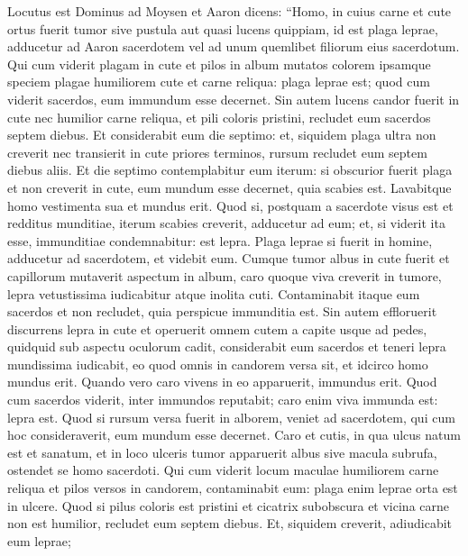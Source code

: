 \begin{biblechapter}  
\verse Locutus est Dominus ad Moysen et Aaron dicens: 
\verse “Homo, in cuius carne et cute ortus fuerit tumor sive pustula aut quasi lucens quippiam, id est plaga leprae, adducetur ad Aaron sacerdotem vel ad unum quemlibet filiorum eius sacerdotum. 
\verse Qui cum viderit plagam in cute et pilos in album mutatos colorem ipsamque speciem plagae humiliorem cute et carne reliqua: plaga leprae est; quod cum viderit sacerdos, eum immundum esse decernet. 
\verse Sin autem lucens candor fuerit in cute nec humilior carne reliqua, et pili coloris pristini, recludet eum sacerdos septem diebus. 
\verse Et considerabit eum die septimo: et, siquidem plaga ultra non creverit nec transierit in cute priores terminos, rursum recludet eum septem diebus aliis. 
\verse Et die septimo contemplabitur eum iterum: si obscurior fuerit plaga et non creverit in cute, eum mundum esse decernet, quia scabies est. Lavabitque homo vestimenta sua et mundus erit. 
\verse Quod si, postquam a sacerdote visus est et redditus munditiae, iterum scabies creverit, adducetur ad eum; 
\verse et, si viderit ita esse, immunditiae condemnabitur: est lepra. 
\verse Plaga leprae si fuerit in homine, adducetur ad sacerdotem, 
\verse et videbit eum. Cumque tumor albus in cute fuerit et capillorum mutaverit aspectum in album, caro quoque viva creverit in tumore, 
\verse lepra vetustissima iudicabitur atque inolita cuti. Contaminabit itaque eum sacerdos et non recludet, quia perspicue immunditia est. 
\verse Sin autem effloruerit discurrens lepra in cute et operuerit omnem cutem a capite usque ad pedes, quidquid sub aspectu oculorum cadit, 
\verse considerabit eum sacerdos et teneri lepra mundissima iudicabit, eo quod omnis in candorem versa sit, et idcirco homo mundus erit. 
\verse Quando vero caro vivens in eo apparuerit, immundus erit.  
\verse Quod cum sacerdos viderit, inter immundos reputabit; caro enim viva immunda est: lepra est. 
\verse Quod si rursum versa fuerit in alborem, veniet ad sacerdotem, 
\verse qui cum hoc consideraverit, eum mundum esse decernet. 
\verse Caro et cutis, in qua ulcus natum est et sanatum, 
\verse et in loco ulceris tumor apparuerit albus sive macula subrufa, ostendet se homo sacerdoti. 
\verse Qui cum viderit locum maculae humiliorem carne reliqua et pilos versos in candorem, contaminabit eum: plaga enim leprae orta est in ulcere. 
\verse Quod si pilus coloris est pristini et cicatrix subobscura et vicina carne non est humilior, recludet eum septem diebus. 
\verse Et, siquidem creverit, adiudicabit eum leprae; 

\end{biblechapter}
